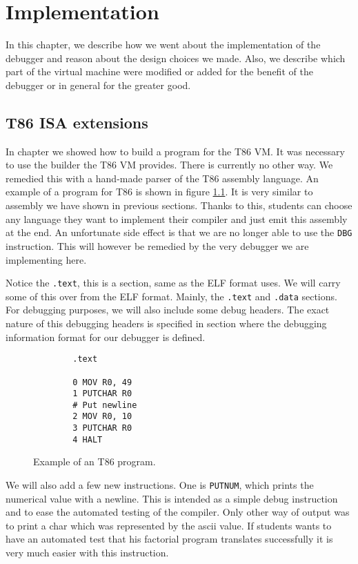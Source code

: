 \chapter{Implementation}
In this chapter, we describe how we went about the implementation
of the debugger and reason about the design choices we made.
Also, we describe which part of the virtual machine were
modified or added for the benefit of the debugger or in
general for the greater good.

\section{T86 ISA extensions}
In chapter  we showed how to build a program for the T86 VM. It was
necessary to use the builder the T86 VM provides. There is currently no other
way. We remedied this with a hand-made parser of the T86 assembly language. An
example of a program for T86 is shown in figure \ref{fig:t86-program}. It is
very similar to assembly we have shown in previous sections. Thanks to this,
students can choose any language they want to implement their compiler and just
emit this assembly at the end. An unfortunate side effect is that we are no
longer able to use the \texttt{DBG} instruction. This will however be remedied
by the very debugger we are implementing here. 

Notice the \texttt{.text}, this is a section, same as the ELF format uses. We
will carry some of this over from the ELF format. Mainly, the \texttt{.text}
and \texttt{.data} sections. For debugging purposes, we will also include some
debug headers. The exact nature of this debugging headers is specified in
section  where the debugging information format for our debugger is
defined.

\begin{figure}
    \begin{lstlisting}
        .text

        0 MOV R0, 49
        1 PUTCHAR R0
        # Put newline
        2 MOV R0, 10
        3 PUTCHAR R0
        4 HALT
    \end{lstlisting}
    \caption{Example of an T86 program.}
    \label{fig:t86-program}
\end{figure}

We will also add a few new instructions. One is \texttt{PUTNUM}, which prints
the numerical value with a newline. This is intended as a simple debug instruction
and to ease the automated testing of the compiler. Only other way of output was
to print a char which was represented by the ascii value. If students wants
to have an automated test that his factorial program translates successfully
it is very much easier with this instruction.

